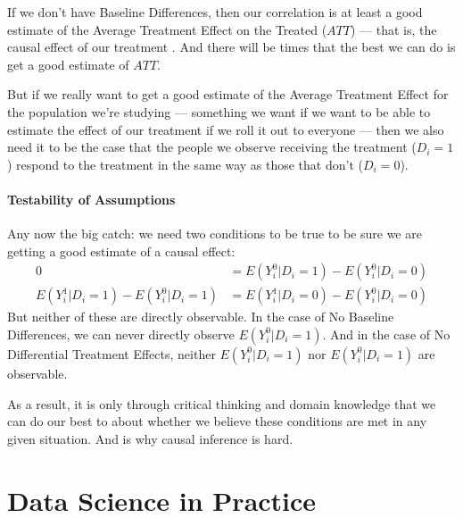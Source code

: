 \documentclass[letterpaper,10pt,english]{jupyterBook}
\begin{document}
\sphinxAtStartPar
If we don’t have Baseline Differences, then our correlation is at least a good estimate of the Average Treatment Effect on the Treated (\(ATT\)) — that is, the causal effect of our treatment . And there will be times that the best we can do is get a good estimate of \(ATT\).

\sphinxAtStartPar
But if we really want to get a good estimate of the Average Treatment Effect for the  population we’re studying — something we want if we want to be able to estimate the effect of our treatment if we roll it out to everyone — then we also need it to be the case that the people we observe receiving the treatment (\(D_i = 1\)) respond to the treatment in the same way as those that don’t (\(D_i = 0\)).


\subsection{Testability of Assumptions}
\label{\detokenize{35_causal/10_potential_outcomes:testability-of-assumptions}}
\sphinxAtStartPar
Any now the big catch: we need two conditions to be true to be sure we are getting a good estimate of a causal effect:
\begin{equation*}
\begin{split}
0 & = E(Y^0_i|D_i = 1) - E(Y_i^0|D_i = 0)\\
E(Y^1_i|D_i = 1) - E(Y_i^0|D_i = 1) &= E(Y^1_i|D_i = 0) - E(Y_i^0|D_i = 0)
\end{split}
\end{equation*}
\sphinxAtStartPar
But neither of these are directly observable. In the case of No Baseline Differences, we can never directly observe \(E(Y^0_i|D_i = 1)\). And in the case of No Differential Treatment Effects, neither \(E(Y_i^0|D_i = 1)\) nor \(E(Y_i^0|D_i = 1)\) are observable.

\sphinxAtStartPar
As a result, it is only through critical thinking and domain knowledge that we can do our best to  about whether we believe these conditions are met in any given situation. And  is why causal inference is hard.

\sphinxstepscope


\part{Data Science in Practice}
\end{document}
